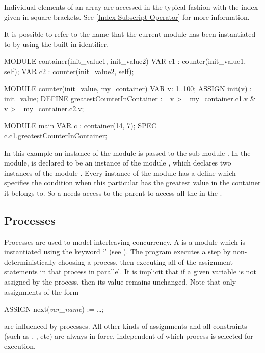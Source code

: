 Individual elements of an array are accessed in the typical fashion
with the index given in square brackets. See \ref{Index Subscript
Operator} for more information.


It is possible to refer to the name that the current module has been
instantiated to by using the  built-in
identifier.
%
\begin{nusmvCode}
MODULE container(init_value1, init_value2)
  VAR c1 : counter(init_value1, self);
  VAR c2 : counter(init_value2, self);

MODULE counter(init_value, my_container)
  VAR v: 1..100;
  ASSIGN 
     init(v) := init_value;
  DEFINE 
     greatestCounterInContainer := v >= my_container.c1.v &
                                   v >= my_container.c2.v;

MODULE main
  VAR c : container(14, 7);
  SPEC
    c.c1.greatestCounterInContainer;
\end{nusmvCode}
%
In this example an instance of the module  is passed
to the sub-module . 
%
In the  module,  is declared to be an instance of
the module , which declares two instances of the module
.
%
Every instance of the  module has a define
 which specifies the condition when
this particular  has the greatest value in the container
it belongs to.  
%
So a  needs access to the parent  to
access all the  in the .


\subsection{Processes}
\label{Processes}
%
%
%
\vspace{3mm}

Processes are used to model interleaving
concurrency. A  is a module which is instantiated
using the keyword `' (see ).
%
The program executes a step by non-deterministically choosing a
process, then executing all of the assignment statements in that
process in parallel. 
%
It is implicit that if a given variable is not assigned by the
process, then its value remains unchanged.
%
Note that only assignments of the form
%
\begin{nusmvCode}
ASSIGN next(\emph{var_name}) := \ldots ;
\end{nusmvCode}
%
are influenced by processes. All other kinds of assignments and
all constraints (such as , , etc) are always in
force, independent of which process is selected for execution.

